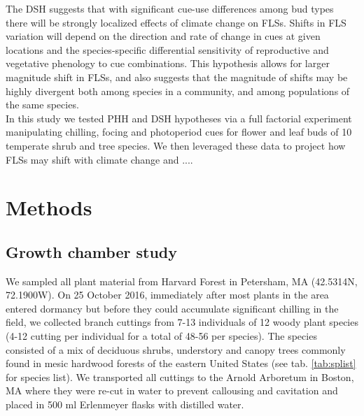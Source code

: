\documentclass[11pt]{article}
\begin{document}
\noindent The DSH suggests that with significant cue-use differences among bud types there will be strongly localized effects of climate change on FLSs. Shifts in FLS variation will depend on the direction and rate of change in cues at given locations and the species-specific differential sensitivity of reproductive and vegetative phenology to cue combinations. This hypothesis allows for larger magnitude shift in FLSs, and also suggests that the magnitude of shifts may be highly divergent both among species in a community, and among populations of the same species.\\%

\noindent In this study we tested PHH and DSH hypotheses via a full factorial experiment manipulating chilling, focing and photoperiod cues for flower and leaf buds of 10 temperate shrub and tree species. We then leveraged these data to project how FLSs may shift with climate change and ....\\ %

\section*{Methods}

\subsection*{Growth chamber study}
\noindent We sampled all plant material from Harvard Forest in Petersham, MA (42.5314\degree N, 72.1900\degree W). On 25 October 2016, immediately after most plants in the area entered dormancy but before they could accumulate significant chilling in the field,  we collected branch cuttings from 7-13 individuals of 12 woody plant species (4-12 cutting per individual for a total of 48-56 per species). The species consisted of a mix of deciduous shrubs, understory and canopy trees commonly found in mesic hardwood forests of the eastern United States (see tab. \ref{tab:splist} for species list). We transported all cuttings to the Arnold Arboretum in Boston, MA where they were re-cut in water to prevent callousing and cavitation and placed in 500 ml Erlenmeyer flasks with distilled water.\\ 
\end{document}
